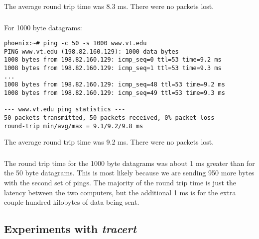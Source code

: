 \documentclass[11pt]{article}
\begin{document}
The average round trip time was 8.3 ms. There were no packets lost.

\subsubsection{}

For 1000 byte datagrams:

\begin{verbatim}
phoenix:~# ping -c 50 -s 1000 www.vt.edu
PING www.vt.edu (198.82.160.129): 1000 data bytes
1008 bytes from 198.82.160.129: icmp_seq=0 ttl=53 time=9.2 ms
1008 bytes from 198.82.160.129: icmp_seq=1 ttl=53 time=9.3 ms
...
1008 bytes from 198.82.160.129: icmp_seq=48 ttl=53 time=9.2 ms
1008 bytes from 198.82.160.129: icmp_seq=49 ttl=53 time=9.3 ms

--- www.vt.edu ping statistics ---
50 packets transmitted, 50 packets received, 0% packet loss
round-trip min/avg/max = 9.1/9.2/9.8 ms
\end{verbatim}

The average round trip time was 9.2 ms. There were no packets lost.

\subsubsection{}

The round trip time for the 1000 byte datagrams was about 1 ms greater than for the 50 byte datagrams. This is most likely because we are sending 950 more bytes with the second set of pings. The majority of the round trip time is just the latency between the two computers, but the additional 1 ms is for the extra couple hundred kilobytes of data being sent.

\subsection{Experiments with \emph{tracert}}

\subsubsection{}
\end{document}
